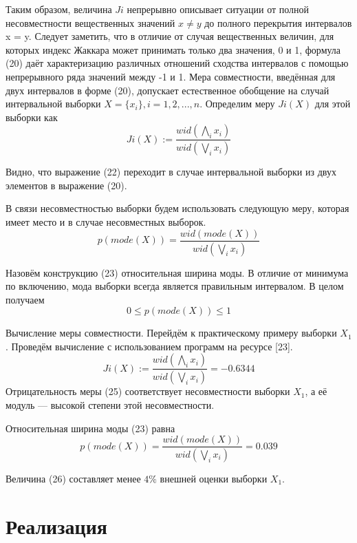 \documentclass[a4paper,14pt]{article}
\begin{document}
	Таким образом, величина $Ji$ непрерывно описывает ситуации от полной несовместности вещественных значений $x \neq y$ до полного перекрытия интервалов
	x = y. Следует заметить, что в отличие от случая вещественных величин, для
	которых индекс Жаккара может принимать только два значения, 0 и 1, формула (20) даёт характеризацию различных отношений сходства интервалов с
	помощью непрерывного ряда значений между -1 и 1.
	Мера совместности, введённая для двух интервалов в форме (20), допускает
	естественное обобщение на случай интервальной выборки $X = \{x_i\}, i = 1, 2, ..., n$.
	Определим меру $Ji(X)$ для этой выборки как
	\begin{equation}
		Ji(X) := \frac{wid(\bigwedge_{i} x_i)}{wid(\bigvee_i x_i)}
	\end{equation}
	
	Видно, что выражение (22) переходит в случае интервальной выборки из двух
	элементов в выражение (20).
	
	В связи несовместностью выборки будем использовать следующую меру, которая имеет место и в случае несовместных выборок.
	\begin{equation}
	p(mode(X)) = \frac{wid(mode(X))}{wid(\bigvee_i x_i)}	
	\end{equation}

	Назовём конструкцию (23) относительная ширина моды. В отличие от минимума по включению, мода выборки всегда является правильным интервалом. В
	целом получаем
	\begin{equation}
		0 \leq p(mode(X)) \leq 1	
	\end{equation}
	
	Вычисление меры совместности. Перейдём к практическому примеру выборки $X_1$. Проведём вычисление с использованием программ на ресурсе [23].
	\begin{equation}
		Ji(X) := \frac{wid(\bigwedge_{i} x_i)}{wid(\bigvee_i x_i)} = - 0.6344
	\end{equation}
	Отрицательность меры (25) соответствует несовместности выборки $X_1$, а её
	модуль — высокой степени этой несовместности.
	
	Относительная ширина моды (23) равна
	\begin{equation}
		p(mode(X)) = \frac{wid(mode(X))}{wid(\bigvee_i x_i)} = 0.039
	\end{equation}

	Величина (26) составляет менее $4\%$ внешней оценки выборки $X_1$.
	\section{Реализация}
\end{document}
